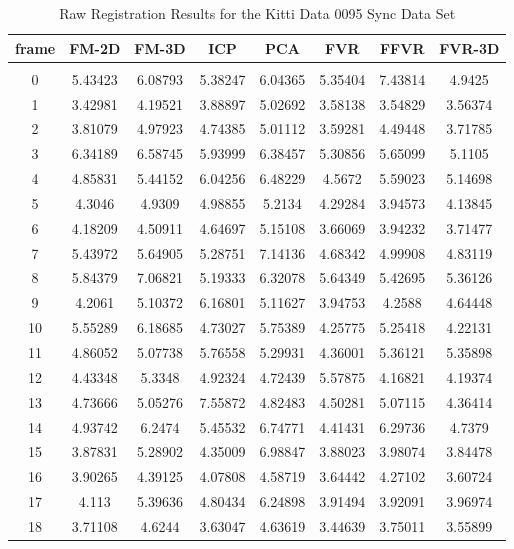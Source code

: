 \begin{center}
\begin{longtable}{cccccccc}
\caption{Raw Registration Results for the Kitti Data 0095 Sync Data Set}
\label{tab:kittidata0095syncFULL}
\endfirsthead
\endhead
\textbf{frame} & \textbf{FM-2D} & \textbf{FM-3D} & \textbf{ICP} & \textbf{PCA} & \textbf{FVR} & \textbf{FFVR} & \textbf{FVR-3D} \\
\hline \\
0 & 5.43423 & 6.08793 & 5.38247 & 6.04365 & 5.35404 & 7.43814 & 4.9425\\
1 & 3.42981 & 4.19521 & 3.88897 & 5.02692 & 3.58138 & 3.54829 & 3.56374\\
2 & 3.81079 & 4.97923 & 4.74385 & 5.01112 & 3.59281 & 4.49448 & 3.71785\\
3 & 6.34189 & 6.58745 & 5.93999 & 6.38457 & 5.30856 & 5.65099 & 5.1105\\
4 & 4.85831 & 5.44152 & 6.04256 & 6.48229 & 4.5672 & 5.59023 & 5.14698\\
5 & 4.3046 & 4.9309 & 4.98855 & 5.2134 & 4.29284 & 3.94573 & 4.13845\\
6 & 4.18209 & 4.50911 & 4.64697 & 5.15108 & 3.66069 & 3.94232 & 3.71477\\
7 & 5.43972 & 5.64905 & 5.28751 & 7.14136 & 4.68342 & 4.99908 & 4.83119\\
8 & 5.84379 & 7.06821 & 5.19333 & 6.32078 & 5.64349 & 5.42695 & 5.36126\\
9 & 4.2061 & 5.10372 & 6.16801 & 5.11627 & 3.94753 & 4.2588 & 4.64448\\
10 & 5.55289 & 6.18685 & 4.73027 & 5.75389 & 4.25775 & 5.25418 & 4.22131\\
11 & 4.86052 & 5.07738 & 5.76558 & 5.29931 & 4.36001 & 5.36121 & 5.35898\\
12 & 4.43348 & 5.3348 & 4.92324 & 4.72439 & 5.57875 & 4.16821 & 4.19374\\
13 & 4.73666 & 5.05276 & 7.55872 & 4.82483 & 4.50281 & 5.07115 & 4.36414\\
14 & 4.93742 & 6.2474 & 5.45532 & 6.74771 & 4.41431 & 6.29736 & 4.7379\\
15 & 3.87831 & 5.28902 & 4.35009 & 6.98847 & 3.88023 & 3.98074 & 3.84478\\
16 & 3.90265 & 4.39125 & 4.07808 & 4.58719 & 3.64442 & 4.27102 & 3.60724\\
17 & 4.113 & 5.39636 & 4.80434 & 6.24898 & 3.91494 & 3.92091 & 3.96974\\
18 & 3.71108 & 4.6244 & 3.63047 & 4.63619 & 3.44639 & 3.75011 & 3.55899\\

\end{longtable}
\end{center}
